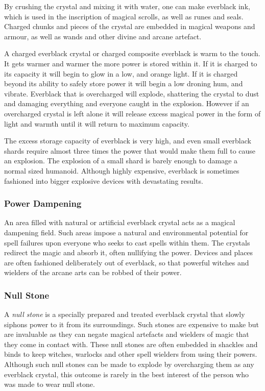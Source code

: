By crushing the crystal and mixing it with water, one can make everblack ink,
which is used in the inscription of magical scrolls, as well as runes and
seals. Charged chunks and pieces of the crystal are embedded in magical
weapons and armour, as well as wands and other divine and arcane artefact.

A charged everblack crystal or charged composite everblack is warm to the touch.
It gets warmer and warmer the more power is stored within it. If it is charged
to its capacity it will begin to glow in a low, and orange light. If it is
charged beyond its ability to safely store power it will begin a low droning
hum, and vibrate. Everblack that is overcharged will explode, shattering the
crystal to dust and damaging everything and everyone caught in the explosion.
However if an overcharged crystal is left alone it will release excess magical
power in the form of light and warmth until it will return to maximum
capacity.

The excess storage capacity of everblack is very high, and even small
everblack shards require almost three times the power that would make them
full to cause an explosion. The explosion of a small shard is barely enough to
damage a normal sized humanoid. Although highly expensive, everblack is
sometimes fashioned into bigger explosive devices with devastating results.


\subsubsection{Power Dampening}

An area filled with natural or artificial everblack crystal acts as a magical
dampening field. Such areas impose a natural and environmental potential for
spell failures upon everyone who seeks to cast spells within them. The
crystals redirect the magic and absorb it, often nullifying the power.
Devices and places are often fashioned deliberately out of everblack, so that
powerful witches and wielders of the arcane arts can be robbed of their power.

\subsubsection{Null Stone}
\label{sec:Null Stone}

A \emph{null stone} is a specially prepared and treated everblack crystal that
slowly siphons power to it from its surroundings. Such stones are expensive to
make but are invaluable as they can negate magical artefacts and wielders of
magic that they come in contact with. These null stones are often embedded in
shackles and binds to keep witches, warlocks and other spell wielders from
using their powers. Although such null stones can be made to explode by
overcharging them as any everblack crystal, this outcome is rarely in the best
interest of the person who was made to wear null stone.

